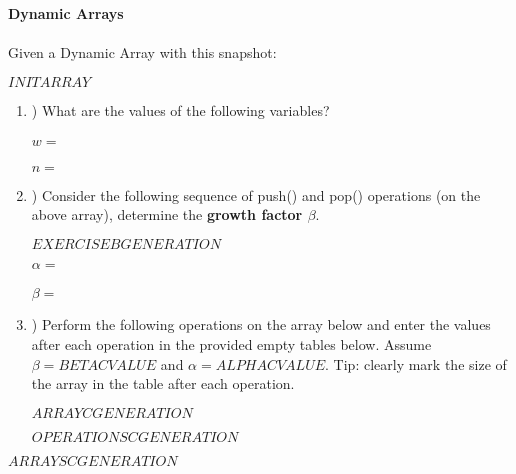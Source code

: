 \textbf{\LARGE{\color{tumgadPurple} Dynamic Arrays}}\\
\\
\noindent
Given a Dynamic Array with this snapshot:
\begin{center}
    $INITARRAY$
\end{center}
\begin{enumerate}[label=\alph*]
    \item \hspace{-5px}) What are the values of the following variables?\\
    \\
    $w = $\\
    \\
    $n = $
    \\
    \item \hspace{-5px}) Consider the following sequence of push() and pop() operations (on the above array), determine the \textbf{growth factor $\beta$}.
    \begin{center}
        $EXERCISEBGENERATION$
    \end{center}
    $\alpha = $\\
    \\
    $\beta = $\\
    \item \hspace{-5px}) Perform the following operations on the array below and enter the values after each operation in the provided empty
    tables below. Assume $\beta = BETACVALUE$ and $\alpha = ALPHACVALUE$. Tip: clearly mark the size of the array in the table after each operation.
    \begin{center}
        $ARRAYCGENERATION$
    \end{center}
    $OPERATIONSCGENERATION$
\end{enumerate}
\begin{center}
    $ARRAYSCGENERATION$
\end{center}
